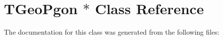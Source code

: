 \hypertarget{class_t_geo_pgon_01_5}{
\section{TGeoPgon $\ast$ Class Reference}
\label{class_t_geo_pgon_01_5}
}


The documentation for this class was generated from the following files: